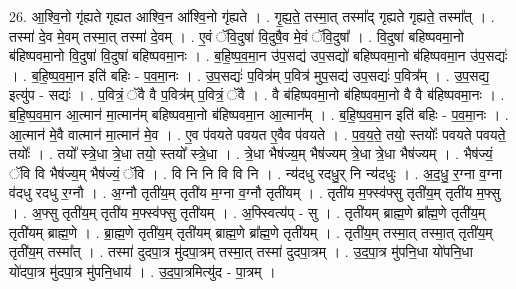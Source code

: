 \documentclass[17pt]{extarticle}
\begin{document}
26. आ॒श्वि॒नो गृ॑ह्यते गृह्यत आश्वि॒न आ᳚श्वि॒नो गृ॑ह्यते । . गृ॒ह्य॒ते॒ तस्मा॒त् तस्मा᳚द् गृह्यते गृह्यते॒ तस्मा᳚त् । . तस्मा॑ दे॒व मे॒वम् तस्मा॒त् तस्मा॑ दे॒वम् । . ए॒वं ॅवि॒दुषा॑ वि॒दुषै॒व मे॒वं ॅवि॒दुषा᳚ । . वि॒दुषा॑ बहिष्पवमा॒नो ब॑हिष्पवमा॒नो वि॒दुषा॑ वि॒दुषा॑ बहिष्पवमा॒नः । . ब॒हि॒ष्प॒व॒मा॒न उ॑प॒सद्य॑ उप॒सद्यो॑ बहिष्पवमा॒नो ब॑हिष्पवमा॒न उ॑प॒सद्यः॑ । . ब॒हि॒ष्प॒व॒मा॒न इति॑ बहिः - प॒व॒मा॒नः । . उ॒प॒सद्यः॑ प॒वित्र॑म् प॒वित्र॑ मुप॒सद्य॑ उप॒सद्यः॑ प॒वित्र᳚म् । . उ॒प॒सद्य॒ इत्यु॑प - सद्यः॑ । . प॒वित्रं॒ ॅवै वै प॒वित्र॑म् प॒वित्रं॒ ॅवै । . वै ब॑हिष्पवमा॒नो ब॑हिष्पवमा॒नो वै वै ब॑हिष्पवमा॒नः । . ब॒हि॒ष्प॒व॒मा॒न आ॒त्मान॑ मा॒त्मान॑म् बहिष्पवमा॒नो ब॑हिष्पवमा॒न आ॒त्मान᳚म् । . ब॒हि॒ष्प॒व॒मा॒न इति॑ बहिः - प॒व॒मा॒नः । . आ॒त्मान॑ मे॒वै वात्मान॑ मा॒त्मान॑ मे॒व । . ए॒व प॑वयते पवयत ए॒वैव प॑वयते । . प॒व॒य॒ते॒ तयो॒ स्तयोः᳚ पवयते पवयते॒ तयोः᳚ । . तयो᳚ स्त्रे॒धा त्रे॒धा तयो॒ स्तयो᳚ स्त्रे॒धा । . त्रे॒धा भैष॑ज्य॒म् भैष॑ज्यम् त्रे॒धा त्रे॒धा भैष॑ज्यम् । . भैष॑ज्यं॒ ॅवि वि भैष॑ज्य॒म् भैष॑ज्यं॒ ॅवि । . वि नि नि वि वि नि । . न्य॑दधु रदधु॒र् नि न्य॑दधुः । . अ॒द॒धु॒ र॒ग्ना व॒ग्ना व॑दधु रदधु र॒ग्नौ । . अ॒ग्नौ तृती॑य॒म् तृती॑य म॒ग्ना व॒ग्नौ तृती॑यम् । . तृती॑य म॒फ्स्व॑फ्सु तृती॑य॒म् तृती॑य म॒फ्सु । . अ॒फ्सु तृती॑य॒म् तृती॑य म॒फ्स्व॑फ्सु तृती॑यम् । . अ॒फ्स्वित्य॑प् - सु । . तृती॑यम् ब्राह्म॒णे ब्रा᳚ह्म॒णे तृती॑य॒म् तृती॑यम् ब्राह्म॒णे । . ब्रा॒ह्म॒णे तृती॑य॒म् तृती॑यम् ब्राह्म॒णे ब्रा᳚ह्म॒णे तृती॑यम् । . तृती॑य॒म् तस्मा॒त् तस्मा॒त् तृती॑य॒म् तृती॑य॒म् तस्मा᳚त् । . तस्मा॑ दुदपा॒त्र मु॑दपा॒त्रम् तस्मा॒त् तस्मा॑ दुदपा॒त्रम् । . उ॒द॒पा॒त्र मु॑पनि॒धा यो॑पनि॒धा यो॑दपा॒त्र मु॑दपा॒त्र मु॑पनि॒धाय॑ । . उ॒द॒पा॒त्रमित्यु॑द - पा॒त्रम् । \newline
\end{document}
